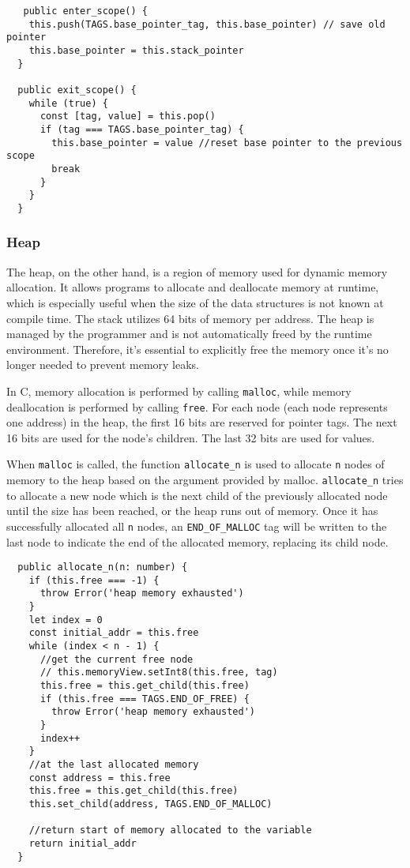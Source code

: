 \documentclass[a4paper]{article}
\begin{document}
\begin{verbatim}
   public enter_scope() {
    this.push(TAGS.base_pointer_tag, this.base_pointer) // save old pointer
    this.base_pointer = this.stack_pointer
  }

  public exit_scope() {
    while (true) {
      const [tag, value] = this.pop()
      if (tag === TAGS.base_pointer_tag) {
        this.base_pointer = value //reset base pointer to the previous scope
        break
      }
    }
  }
\end{verbatim}


\subsubsection{Heap}

The heap, on the other hand, is a region of memory used for dynamic memory allocation. It allows programs to allocate and deallocate memory at runtime, which is especially useful when the size of the data structures is not known at compile time. The stack utilizes 64 bits of memory per address. The heap is managed by the programmer and is not automatically freed by the runtime environment. Therefore, it's essential to explicitly free the memory once it's no longer needed to prevent memory leaks.

In C, memory allocation is performed by calling \texttt{malloc}, while memory deallocation is performed by calling \texttt{free}. For each node (each node represents one address) in the heap, the first 16 bits are reserved for pointer tags. The next 16 bits are used for the node's children. The last 32 bits are used for values.

When \texttt{malloc} is called, the function \texttt{allocate\_n} is used to allocate \texttt{n} nodes of memory to the heap based on the argument provided by malloc. \texttt{allocate\_n} tries to allocate a new node which is the next child of the previously allocated node until the size has been reached, or the heap runs out of memory. Once it has successfully allocated all \texttt{n} nodes, an \texttt{END\_OF\_MALLOC} tag will be written to the last node to indicate the end of the allocated memory, replacing its child node.
\begin{verbatim}
  public allocate_n(n: number) {
    if (this.free === -1) {
      throw Error('heap memory exhausted')
    }
    let index = 0
    const initial_addr = this.free
    while (index < n - 1) {
      //get the current free node
      // this.memoryView.setInt8(this.free, tag)
      this.free = this.get_child(this.free)
      if (this.free === TAGS.END_OF_FREE) {
        throw Error('heap memory exhausted')
      }
      index++
    }
    //at the last allocated memory
    const address = this.free
    this.free = this.get_child(this.free)
    this.set_child(address, TAGS.END_OF_MALLOC) 

    //return start of memory allocated to the variable
    return initial_addr
  }
\end{verbatim}
\end{document}
